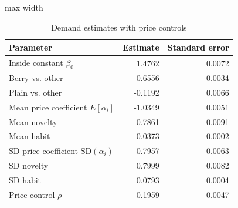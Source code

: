 \begin{table}[htbp]\centering\small
\caption{Demand estimates with price controls}
\label{tab:demand-estimates-controlled}
\begin{adjustbox}{max width=\linewidth}
\begin{tabular}{lrr}\toprule
Parameter & Estimate & Standard error\\\midrule
Inside constant $\beta_0$ & 1.4762 & 0.0072 \\
Berry vs. other & -0.6556 & 0.0034 \\
Plain vs. other & -0.1192 & 0.0066 \\
Mean price coefficient $E[\alpha_i]$ & -1.0349 & 0.0051 \\
Mean novelty & -0.7861 & 0.0091 \\
Mean habit & 0.0373 & 0.0002 \\
SD price coefficient $\mathrm{SD}(\alpha_i)$ & 0.7957 & 0.0063 \\
SD novelty & 0.7999 & 0.0082 \\
SD habit & 0.0793 & 0.0004 \\
Price control $\rho$ & 0.1959 & 0.0047 \\
\bottomrule\end{tabular}
\end{adjustbox}
\end{table}
